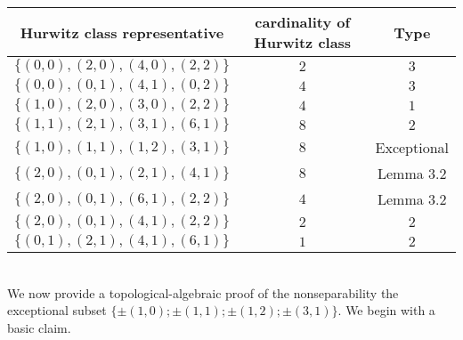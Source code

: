 \documentclass[article,dvisp]{amsart}
\def\Z{\mathbb{Z}}
\theoremstyle{definition}
\theoremstyle{remark}
\numberwithin{equation}{section}
\theoremstyle{lemma}
\begin{document}
\begin{center}
\begin{tabular}{|c|c|c|}
\hline
Hurwitz class representative& cardinality of Hurwitz class & Type\\
\hline
$\{(0,0),(2,0),(4,0),(2,2)\}$&$2$&$3$\\
\hline
$\{(0,0),(0,1),(4,1),(0,2)\}$&$4$&$3$\\
\hline
$\{(1,0),(2,0),(3,0),(2,2)\}$&$4$&$1$\\
\hline
$\{(1,1),(2,1),(3,1),(6,1)\}$&$8$&$2$\\
\hline
$\{(1,0),(1,1),(1,2),(3,1)\}$&$8$& Exceptional\\
\hline
$\{(2,0),(0,1),(2,1),(4,1)\}$&$8$& Lemma 3.2\\
\hline
$\{(2,0),(0,1),(6,1),(2,2)\}$&$4$& Lemma 3.2 \\
\hline
$\{(2,0),(0,1),(4,1),(2,2)\}$&$2$&$2$\\
\hline
$\{(0,1),(2,1),(4,1),(6,1)\}$&$1$&$2$\\
\hline
\end{tabular}
\end{center}\
\\
We now provide a topological-algebraic proof of the nonseparability the exceptional subset $\{\pm(1,0);\pm(1,1);\pm(1,2);\pm(3,1)\}$. We begin with a basic claim.
\end{document}
